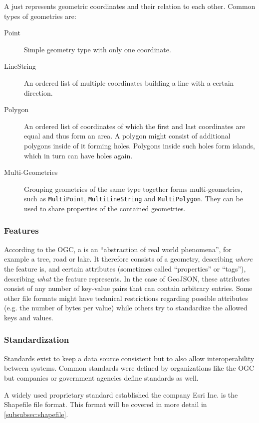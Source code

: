 			A  just represents geometric coordinates and their relation to each other.
			Common types of geometries are:
			\begin{description}
				\item[Point] Simple geometry type with only one coordinate.
				\item[LineString] An ordered list of multiple coordinates building a line with a certain direction.
				\item[Polygon] An ordered list of coordinates of which the first and last coordinates are equal and thus form an area. A polygon might consist of additional polygons inside of it forming holes. Polygons inside such holes form islands, which in turn can have holes again.
				\item[Multi-Geometries] Grouping geometries of the same type together forms multi-geometries, such as \texttt{MultiPoint}, \texttt{MultiLineString} and \texttt{MultiPolygon}. They can be used to share properties of the contained geometries.
			\end{description}
		
		\subsubsection{Features}
		
			According to the OGC, a  is an \enquote{abstraction of real world phenomena}\cite{ogc-sfa}, for example a tree, road or lake.
			It therefore consists of a geometry, describing \textit{where} the feature is, and certain attributes (sometimes called \enquote{properties} or \enquote{tags}), describing \textit{what} the feature represents.
			In the case of GeoJSON, these attributes consist of any number of key-value pairs that can contain arbitrary entries.
			Some other file formats might have technical restrictions regarding possible attributes (e.g. the number of bytes per value) while others try to standardize the allowed keys and values.
		
		\subsubsection{Standardization}
		
			Standards exist to keep a data source consistent but to also allow interoperability between systems.
			Common standards were defined by organizations like the OGC but companies or government agencies define standards as well.
			
			A widely used proprietary standard established the company Esri Inc. is the Shapefile file format.
			This format will be covered in more detail in \cref{subsubsec:shapefile}.
			
